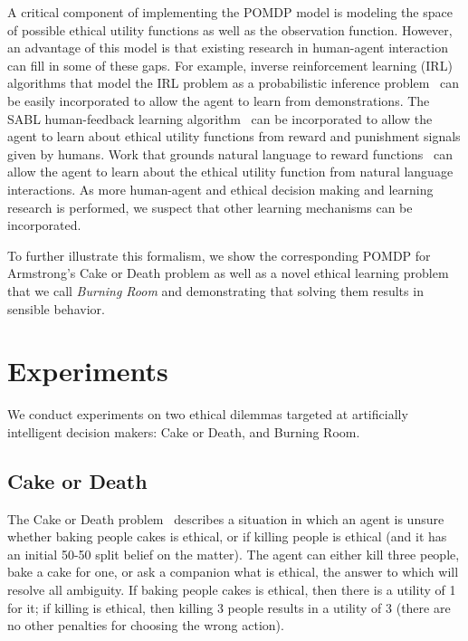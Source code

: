 \documentclass[11pt]{article}
\begin{document}
A critical component of implementing the POMDP model is modeling the space of possible ethical utility functions as well as the observation function. However, an advantage of this model is that existing research in human-agent interaction can fill in some of these gaps. For example, inverse reinforcement learning (IRL) algorithms that model the IRL problem as a probabilistic inference problem~\cite{ramachandran2007bayesian,ziebart2008maximum,babes2011apprenticeship,macglashan2015between} can be easily incorporated to allow the agent to learn from demonstrations. The SABL human-feedback learning algorithm~\cite{loftin2014strategy} can be incorporated to allow the agent to learn about ethical utility functions from reward and punishment signals given by humans. Work that grounds natural language to reward functions~\cite{macglashanGrounding2015} can allow the agent to learn about the ethical utility function from natural language interactions. As more human-agent and ethical decision making and learning research is performed, we suspect that other learning mechanisms can be incorporated.

To further illustrate this formalism, we show the corresponding POMDP for Armstrong's Cake or Death problem as well as a novel ethical learning problem that we call {\em Burning Room} and demonstrating that solving them results in sensible behavior.






\section{Experiments}

We conduct experiments on two ethical dilemmas targeted at artificially intelligent decision makers: Cake or Death, and Burning Room.

\subsection{Cake or Death}
The Cake or Death problem~\cite{AAAIW1510183} describes a situation in which an agent is unsure whether baking people cakes is ethical, or if killing people is ethical (and it has an initial 50-50 split belief on the matter). The agent can either kill three people, bake a cake for one, or ask a companion what is ethical, the answer to which will resolve all ambiguity. If baking people cakes is ethical, then there is a utility of 1 for it; if killing is ethical, then killing 3 people results in a utility of 3 (there are no other penalties for choosing the wrong action).
\end{document}

